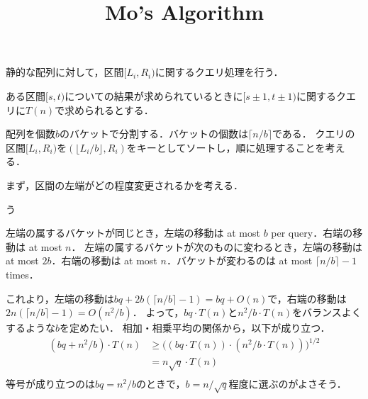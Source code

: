 \documentclass{jsarticle}
\title{Mo's Algorithm}
\newcommand{\floor}[1]{\lfloor #1\rfloor}
\newcommand{\ceil}[1]{\lceil #1\rceil}
\begin{document}
\maketitle

静的な配列に対して，区間$[L_i, R_i)$に関するクエリ処理を行う．
\iffalse
]\fi
ある区間$[s, t)$についての結果が求められているときに$[s\pm1, t\pm1)$に関するクエリに$T(n)$で求められるとする．
\iffalse
]]\fi

配列を個数$b$のバケットで分割する．バケットの個数は$\ceil{n/b}$である．
クエリの区間$[L_i, R_i)$を$(\floor{L_i/b}, R_i)$をキーとしてソートし，順に処理することを考える．
\iffalse
]\fi

まず，区間の左端がどの程度変更されるかを考える．

う

左端の属するバケットが同じとき，左端の移動は at most $b$ per query．右端の移動は at most $n$．
左端の属するバケットが次のものに変わるとき，左端の移動は at most $2b$．右端の移動は at most $n$．バケットが変わるのは at most $\ceil{n/b}-1$ times．

これより，左端の移動は$bq + 2b(\ceil{n/b}-1) = bq+O(n)$で，右端の移動は$2n(\ceil{n/b}-1) = O(n^2/b)$．
よって，$bq\cdot T(n)$と$n^2/b\cdot T(n)$をバランスよくするような$b$を定めたい．
相加・相乗平均の関係から，以下が成り立つ．
\begin{align*}
  (bq+n^2/b)\cdot T(n)
  &\ge \big((bq\cdot T(n))\cdot(n^2/b\cdot T(n))\big)^{1/2}\\
  &= n\sqrt q\cdot T(n)\\
\end{align*}
等号が成り立つのは$bq=n^2/b$のときで，$b=n/\sqrt{q}$程度に選ぶのがよさそう．
\end{document}
